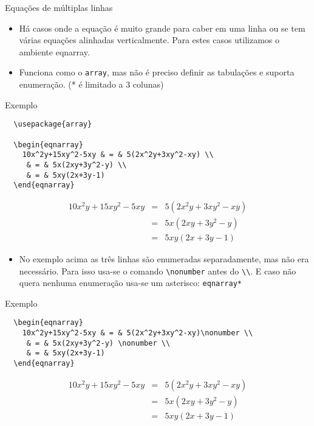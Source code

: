 \begin{frame}{Equações de múltiplas linhas}
    \begin{itemize}
    \item Há casos onde a equação é muito grande para caber em uma linha ou se tem várias equações alinhadas verticalmente.
    Para estes casos utilizamos o ambiente \alert{eqnarray}.
    \item Funciona como o \verb|array|, mas não é preciso definir as tabulações e suporta enumeração. (* é limitado a 3 colunas)
    \end{itemize}

    \begin{exampleblock}{Exemplo}
\begin{verbatim}
  \usepackage{array}

  \begin{eqnarray}
    10x^2y+15xy^2-5xy & = & 5(2x^2y+3xy^2-xy) \\
     & = & 5x(2xy+3y^2-y) \\
     & = & 5xy(2x+3y-1)
  \end{eqnarray}
\end{verbatim}
    \begin{eqnarray}
    10x^2y + 15xy^2 - 5xy & = & 5(2x^2y + 3xy^2 - xy) \\
     & = & 5x(2xy + 3y^2 - y) \\
     & = & 5xy(2x + 3y - 1)
    \end{eqnarray}
    \end{exampleblock}

    \begin{itemize}
    \item No exemplo acima as três linhas são enumeradas separadamente, mas não era necessário. Para isso usa-se o comando \verb|\nonumber| antes do \verb|\\|. E caso não quera nenhuma enumeração usa-se um asterisco: \verb|eqnarray*|
    \end{itemize}

    \begin{exampleblock}{Exemplo}
\begin{verbatim}
  \begin{eqnarray}
    10x^2y+15xy^2-5xy & = & 5(2x^2y+3xy^2-xy)\nonumber \\
     & = & 5x(2xy+3y^2-y) \nonumber \\
     & = & 5xy(2x+3y-1)
  \end{eqnarray}
\end{verbatim}
    \begin{eqnarray}
    10x^2y + 15xy^2 - 5xy & = & 5(2x^2y + 3xy^2 - xy) \nonumber \\
     & = & 5x(2xy + 3y^2 - y) \nonumber \\
     & = & 5xy(2x + 3y - 1)
    \end{eqnarray}
    \end{exampleblock}


\end{frame}


